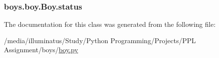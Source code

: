 \subsubsection[{\texorpdfstring{status}{status}}]{\setlength{\rightskip}{0pt plus 5cm}boys.\+boy.\+Boy.\+status}\hypertarget{classboys_1_1boy_1_1_boy_a3932b84d71dfe36bb93c551dc5c40bed}{}\label{classboys_1_1boy_1_1_boy_a3932b84d71dfe36bb93c551dc5c40bed}


The documentation for this class was generated from the following file\+:\begin{DoxyCompactItemize}
\item 
/media/illuminatus/\+Study/\+Python Programming/\+Projects/\+P\+P\+L Assignment/boys/\hyperlink{boy_8py}{boy.\+py}\end{DoxyCompactItemize}
